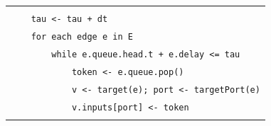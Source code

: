 \documentclass[
]{article}
\newcommand{\passthrough}[1]{#1}
\newcounter{none} %
\begin{document}
{\def\LTcaptype{none} %
\begin{longtable}[]{@{}
  >{\raggedright\arraybackslash}p{}@{}}
\toprule\noalign{}
\endhead
\bottomrule\noalign{}
\endlastfoot
\begin{minipage}[t]{\linewidth}\raggedright
\passthrough{\lstinline!procedure!}\passthrough{\lstinline! !}\passthrough{\lstinline!TICK(dt,!}\passthrough{\lstinline! !}\passthrough{\lstinline!maxFires!}\passthrough{\lstinline!)!}\strut \\
\passthrough{\lstinline!    !}\passthrough{\lstinline!tau!}\passthrough{\lstinline! !}\passthrough{\lstinline!<-!}\passthrough{\lstinline! !}\passthrough{\lstinline!tau!}\passthrough{\lstinline! !}\passthrough{\lstinline!+!}\passthrough{\lstinline! !}\passthrough{\lstinline!dt!}\strut \\
\passthrough{\lstinline!    !}\passthrough{\lstinline!for!}\passthrough{\lstinline! !}\passthrough{\lstinline!each!}\passthrough{\lstinline! !}\passthrough{\lstinline!edge!}\passthrough{\lstinline! !}\passthrough{\lstinline!e!}\passthrough{\lstinline! !}\passthrough{\lstinline!in!}\passthrough{\lstinline! !}\passthrough{\lstinline!E!}\strut \\
\passthrough{\lstinline!        !}\passthrough{\lstinline!while!}\passthrough{\lstinline! !}\passthrough{\lstinline!e.queue.head.t!}\passthrough{\lstinline! !}\passthrough{\lstinline!+!}\passthrough{\lstinline! !}\passthrough{\lstinline!e.delay!}\passthrough{\lstinline! !}\passthrough{\lstinline!<=!}\passthrough{\lstinline! !}\passthrough{\lstinline!tau!}\strut \\
\passthrough{\lstinline!            !}\passthrough{\lstinline!token!}\passthrough{\lstinline! !}\passthrough{\lstinline!<-!}\passthrough{\lstinline! !}\passthrough{\lstinline!e.queue.pop!}\passthrough{\lstinline!()!}\strut \\
\passthrough{\lstinline!            !}\passthrough{\lstinline!v!}\passthrough{\lstinline! !}\passthrough{\lstinline!<-!}\passthrough{\lstinline! !}\passthrough{\lstinline!target(e);!}\passthrough{\lstinline! !}\passthrough{\lstinline!port!}\passthrough{\lstinline! !}\passthrough{\lstinline!<-!}\passthrough{\lstinline! !}\passthrough{\lstinline!targetPort!}\passthrough{\lstinline!(e)!}\strut \\
\passthrough{\lstinline!            !}\passthrough{\lstinline!v.inputs!}\passthrough{\lstinline![port]!}\passthrough{\lstinline! !}\passthrough{\lstinline!<-!}\passthrough{\lstinline! !}\passthrough{\lstinline!token!}\strut \\

\end{minipage}
\end{longtable}}
\end{document}
